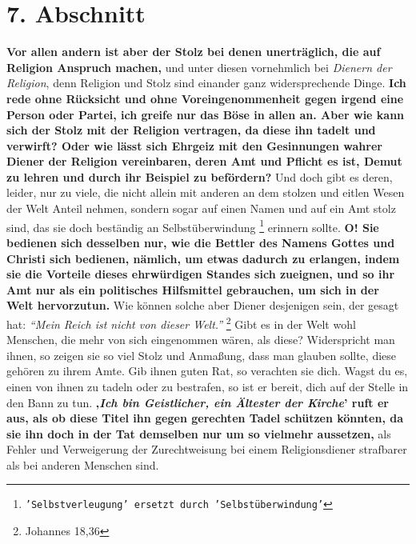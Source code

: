 \section{7. Abschnitt} \label{kap12_ab7}

 \label{ref:12_07_eitle_menschen_religion}
\textbf{Vor allen andern ist aber der Stolz bei denen
unerträglich, die auf Religion
Anspruch machen,} und unter diesen vornehmlich bei \textit{Dienern der
Religion}, denn
Religion und Stolz sind einander ganz widersprechende Dinge. \textbf{Ich rede
ohne
Rücksicht und ohne Voreingenommenheit gegen irgend eine Person oder Partei, ich
greife nur das Böse in allen an. Aber wie kann sich der Stolz
mit der Religion
vertragen, da diese ihn tadelt und verwirft? Oder wie lässt sich Ehrgeiz mit den
Gesinnungen wahrer Diener der Religion vereinbaren, deren Amt und Pflicht es ist,
Demut zu lehren und durch ihr Beispiel zu befördern?} Und doch gibt es deren,
leider, nur zu viele, die nicht allein mit anderen an dem stolzen und eitlen
Wesen der Welt Anteil nehmen, sondern sogar auf einen Namen und auf ein Amt
stolz sind, das sie doch beständig an
Selbstüberwindung
\footnote{\texttt{'Selbstverleugung' ersetzt durch 'Selbstüberwindung'}}
erinnern sollte. 
\label{ref:12_07_eitle_menschen_religion_2} \textbf{O! Sie
bedienen sich desselben nur, wie die Bettler des Namens Gottes und Christi sich
bedienen, nämlich, um etwas dadurch zu erlangen, indem sie die Vorteile dieses
ehrwürdigen Standes sich zueignen, und so ihr Amt nur als ein politisches
Hilfsmittel gebrauchen, um sich in der Welt hervorzutun.} Wie können solche
aber
Diener desjenigen sein, der gesagt hat:
\textit{"`Mein Reich ist nicht von dieser
Welt."'}
\footnote{Johannes 18,36}
Gibt es in der Welt wohl Menschen, die mehr von
sich eingenommen wären, als diese? Widerspricht man ihnen, so zeigen sie so viel
Stolz und Anmaßung, dass man glauben sollte, diese gehören zu ihrem Amte. Gib
ihnen guten Rat, so verachten sie dich. Wagst du es, einen von ihnen zu tadeln
oder zu bestrafen, so ist er bereit, dich auf der Stelle in den Bann
zu tun. \label{ref:12_07_eitle_menschen_geislicher}
\textbf{‚\textit{Ich bin Geistlicher, ein Ältester der Kirche}’ ruft er aus,
als ob diese Titel
ihn gegen gerechten Tadel schützen könnten, da sie ihn doch in der Tat
demselben nur um so vielmehr aussetzen,} als Fehler und Verweigerung der
Zurechtweisung bei einem Religionsdiener strafbarer als bei anderen Menschen
sind.

